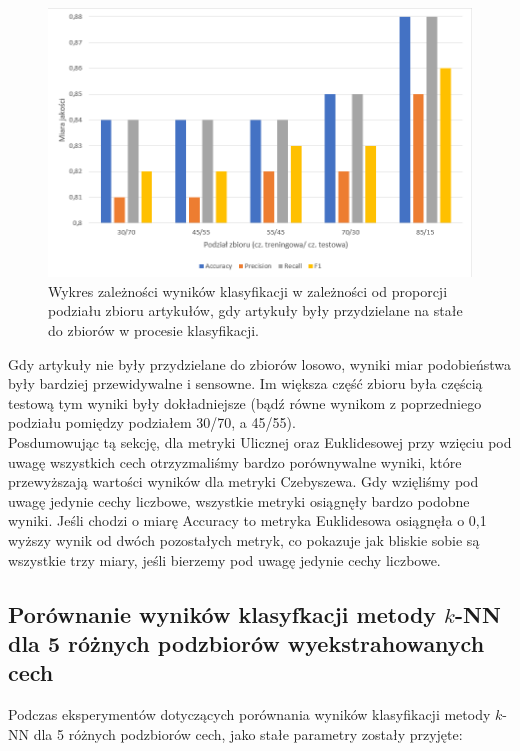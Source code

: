 \documentclass{classrep}
\begin{document}
\begin{figure}[H]
    \centering
    \includegraphics[width=14cm]{ranges_const_bar_chart.png}
    \caption{Wykres zależności wyników klasyfikacji w zależności od proporcji podziału zbioru artykułów, gdy artykuły były przydzielane na stałe do zbiorów w procesie klasyfikacji.}
    \label{wykres:proporcja_stale}
\end{figure}


Gdy artykuły nie były przydzielane do zbiorów losowo, wyniki miar podobieństwa były bardziej przewidywalne i sensowne. Im większa część zbioru była częścią testową tym wyniki były dokładniejsze (bądź równe wynikom z poprzedniego podziału pomiędzy podziałem 30/70, a 45/55).\\
\indent Posdumowując tą sekcję, dla metryki Ulicznej oraz Euklidesowej przy wzięciu pod uwagę wszystkich cech otrzyzmaliśmy bardzo porównywalne wyniki, które przewyższają wartości wyników dla metryki Czebyszewa. Gdy wzięliśmy pod uwagę jedynie cechy liczbowe, wszystkie metryki osiągnęły bardzo podobne wyniki. Jeśli chodzi o miarę Accuracy to metryka Euklidesowa osiągnęła o 0,1 wyższy wynik od dwóch pozostałych metryk, co pokazuje jak bliskie sobie są wszystkie trzy miary, jeśli bierzemy pod uwagę jedynie cechy liczbowe.

\subsection{Porównanie wyników klasyfkacji metody $k$-NN dla 5 różnych podzbiorów wyekstrahowanych cech}
Podczas eksperymentów dotyczących porównania wyników klasyfikacji metody $k$-NN dla 5 różnych podzbiorów cech, jako stałe parametry zostały przyjęte:
\end{document}
